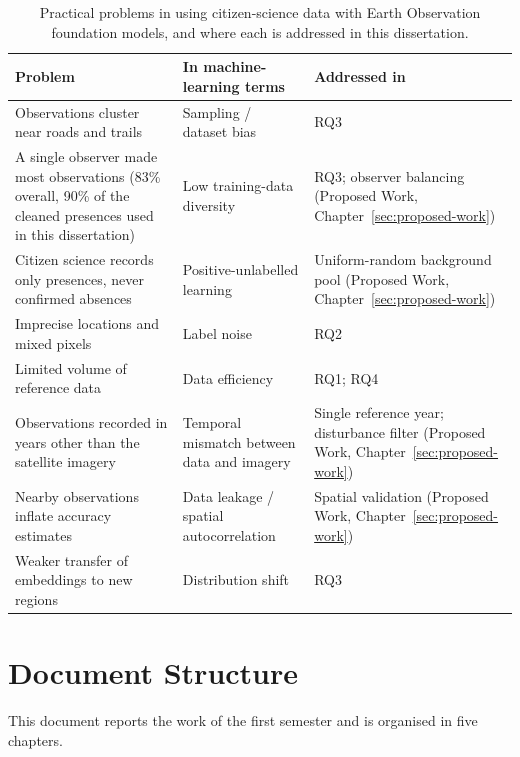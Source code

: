 \begin{table}[htb]
\centering
\begin{tabularx}{\textwidth}{|>{\raggedright\arraybackslash}X|>{\raggedright\arraybackslash}X|>{\raggedright\arraybackslash}X|}
\hline
\textbf{Problem} & \textbf{In machine-learning terms} & \textbf{Addressed in} \\
\hline
Observations cluster near roads and trails \cite{dimson2023} &
Sampling / dataset bias & RQ3 \\
\hline
A single observer made most observations (83\% overall, 90\% of the
cleaned presences used in this dissertation) & Low training-data diversity &
RQ3; observer balancing (Proposed Work, Chapter~\ref{sec:proposed-work}) \\
\hline
Citizen science records only presences, never confirmed absences
\cite{phillips2009} & Positive-unlabelled learning & Uniform-random
background pool (Proposed Work, Chapter~\ref{sec:proposed-work}) \\
\hline
Imprecise locations and mixed pixels \cite{ball2026} & Label noise &
RQ2 \\
\hline
Limited volume of reference data & Data efficiency & RQ1; RQ4 \\
\hline
Observations recorded in years other than the satellite imagery
\cite{ball2026} & Temporal mismatch between data and imagery & Single
reference year; disturbance filter (Proposed Work, Chapter~\ref{sec:proposed-work}) \\
\hline
Nearby observations inflate accuracy estimates \cite{karasiak2022} &
Data leakage / spatial autocorrelation & Spatial validation
(Proposed Work, Chapter~\ref{sec:proposed-work}) \\
\hline
Weaker transfer of embeddings to new regions \cite{yang2026} &
Distribution shift & RQ3 \\
\hline
\end{tabularx}
\caption{Practical problems in using citizen-science data with Earth
Observation foundation models, and where each is addressed in this
dissertation.}
\label{tab:introduction-problems}
\end{table}

\section{Document Structure}
\label{sec:introduction-structure}
This document reports the work of the first semester and is
organised in five chapters.

